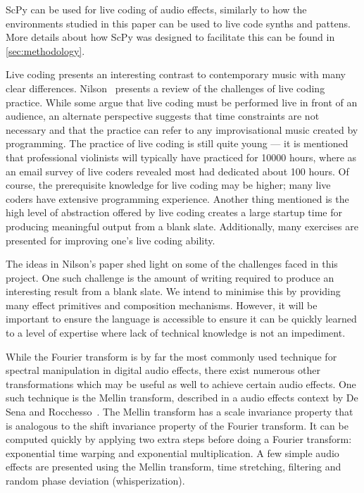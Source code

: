 \documentclass{article}
\begin{document}
ScPy can be used for live coding of audio effects, similarly to how the environments studied in
this paper can be used to live code synths and pattens. More details about how ScPy was designed to
facilitate this can be found in \autoref{sec:methodology}.

Live coding presents an interesting contrast to contemporary music with many clear differences.
Nilson~\cite{nilson2007live} presents a review of the challenges of live coding
practice. While some argue that live coding must be performed live in front of an
audience, an alternate perspective suggests that time constraints are not necessary and that the
practice can refer to any improvisational music created by programming. The practice of live coding
is still quite young --- it is mentioned that professional violinists will typically have practiced
for 10000 hours, where as an email survey of live coders revealed most had dedicated about 100
hours. Of course, the prerequisite knowledge for live coding may be higher; many live coders have
extensive programming experience. Another thing mentioned is the high level of abstraction offered
by live coding creates a large startup time for producing meaningful output from a blank slate.
Additionally, many exercises are presented for improving one's live coding ability.

The ideas in Nilson's paper shed light on some of the challenges faced in this project.
One such challenge is the amount of writing required to produce an interesting result from a blank
slate. We intend to minimise this by providing many effect primitives and composition
mechanisms. However, it will be important to ensure the language is accessible to ensure it can be
quickly learned to a level of expertise where lack of technical knowledge is not an impediment.

While the Fourier transform is by far the most commonly used technique for spectral manipulation in
digital audio effects, there exist numerous other transformations which may be useful as well to
achieve certain audio effects. One such technique is the Mellin transform, described in a audio
effects context by De Sena and Rocchesso~\cite{de2004fast}. The Mellin transform has a scale
invariance property that is analogous to the shift invariance property of the Fourier transform. It
can be computed quickly by applying two extra steps before doing a Fourier transform: exponential
time warping and exponential multiplication. A few simple audio effects are presented using the
Mellin transform, time stretching, filtering and random phase deviation (whisperization).
\end{document}

